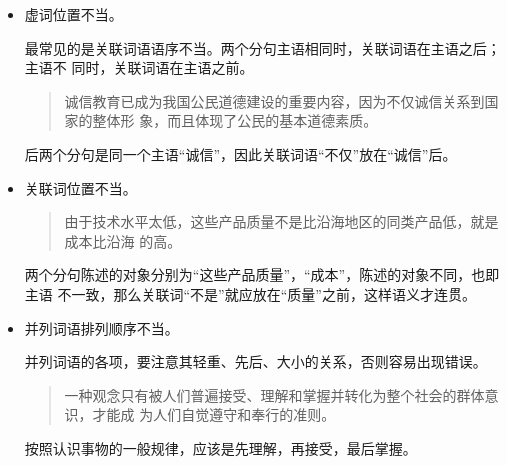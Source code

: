 \documentclass[final,oneside]{ctexbook}
\newenvironment{equotation}{\begin{quotation}\kaishu}{\end{quotation}}
\begin{document}
\begin{itemize}
    复杂状语的排列顺序一般是：
    \begin{enumerate}
      \item 表目的或原因的介宾短语；
      \item 表时间的名词或介宾短语；
      \item 表处所的名词或介宾短语；
      \item 表范围、频率等的副词；
      \item 表情态的形容词；
      \item 表对象的介宾短语。
    \end{enumerate}

    \begin{equotation}
      在休息室里许多老师昨天都同他热情地交谈。
    \end{equotation}
    正确次序应是：许多老师昨天（时间）在休息室里（处所）都（范围）热情地（情态）
    同他（对象）交谈。

  \item 虚词位置不当。

    最常见的是关联词语语序不当。两个分句主语相同时，关联词语在主语之后；主语不
    同时，关联词语在主语之前。

    \begin{equotation}
      诚信教育已成为我国公民道德建设的重要内容，因为不仅诚信关系到国家的整体形
      象，而且体现了公民的基本道德素质。
    \end{equotation}
    后两个分句是同一个主语“诚信”，因此关联词语“不仅”放在“诚信”后。

  \item 关联词位置不当。

    \begin{equotation}
      由于技术水平太低，这些产品质量不是比沿海地区的同类产品低，就是成本比沿海
      的高。
    \end{equotation}
    两个分句陈述的对象分别为“这些产品质量”，“成本”，陈述的对象不同，也即主语
    不一致，那么关联词“不是”就应放在“质量”之前，这样语义才连贯。

  \item 并列词语排列顺序不当。

    并列词语的各项，要注意其轻重、先后、大小的关系，否则容易出现错误。
    \begin{equotation}
      一种观念只有被人们普遍接受、理解和掌握并转化为整个社会的群体意识，才能成
      为人们自觉遵守和奉行的准则。
    \end{equotation}

    按照认识事物的一般规律，应该是先理解，再接受，最后掌握。

\end{itemize}
\end{document}
